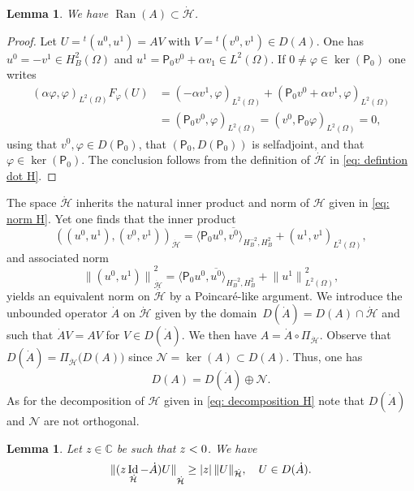 \documentclass[JEP,XML,SOM,Unicode,published]{cedram}
\theoremstyle{plain}
\newtheorem{lemma}[theorem]{Lemma}
\theoremstyle{definition}
\def\C{\mathbb{C}}
\let \Re \relax
\DeclareMathOperator{\Re}{Re}
\newcommand{\ovl}[1]{\overline{#1}}
\newcommand{\inp}[2]{(#1, #2)}
\newcommand{\dup}[2]{\langle #1 , #2 \rangle}
\renewcommand{\H}{{\mathcal H}}
\newcommand{\transp}{\ensuremath{\phantom{}^{t}}}
\newcommand{\Norm}[2]{{\| #1 \|}_{#2}}
\newcommand{\Pell}{\mathsf P_0}
\DeclareMathOperator{\id}{Id}
\DeclareMathOperator{\range}{Ran}
\begin{document}
\begin{lemma}
\label{lemma: stability dot H}
We have $\range(A) \subset \dot{\H}$.
\end{lemma}
\begin{proof}
Let $U = \transp(u^0,u^1)= A V$ with $V= \transp(v^0,v^1) \in
D(A)$. One has $u^0 = -v^1 \in H^2_B (\Omega) $ and $u^1 = \Pell
v^0 + \alpha v_1 \in
L^2(\Omega)$. If $0 \neq \varphi \in \ker(\Pell)$ one writes
\begin{align*}
\inp{\alpha\varphi}{\varphi}_{L^2(\Omega)}
F_{\varphi} (U) &=
\inp{-\alpha v^1}{\varphi}_{L^2(\Omega)}
+ \inp{\Pell v^0 + \alpha v^1}{\varphi}_{L^2(\Omega)}\\
&=\inp{\Pell v^0}{\varphi}_{L^2(\Omega)}
= \inp{v^0}{\Pell \varphi}_{L^2(\Omega)}=0,
\end{align*}
using that $v^0, \varphi \in D(\Pell)$, that $(\Pell, D(\Pell))$ is
selfadjoint, and that $\varphi \in \ker(\Pell)$. The conclusion
follows from the definition of $\dot{\H}$ in \eqref{eq: defintion dot H}.
\end{proof}
The space $\dot{\H}$ inherits the natural inner product and norm of
$\H$ given in \eqref{eq: norm H}.
Yet one finds that the inner product
\begin{equation}
\label{eq: inner product dot H}
\inp{(u^0,u^1)}{(v^0,v^1)}_{\dot \H}
= \dup{\Pell u^0}{\ovl{v^0}}_{H^{-2}_B,H^2_B}
+ \inp{u^1}{v^1}_{L^2(\Omega)},
\end{equation}
and associated norm
\begin{equation}
\label{eq: norm dot H}
\Norm{(u^0,u^1)}{\dot \H}^2
= \dup{\Pell u^0}{\ovl{u^0}}_{H^{-2}_B,H^2_B} + \Norm{u^1}{L^2(\Omega)}^2,
\end{equation}
yields an equivalent norm on $\dot \H$ by a Poincaré-like argument.
We introduce the unbounded operator
$\dot{A}$ on $\dot{\H}$ given by the domain~\hbox{$D(\dot{A}) = D(A) \cap \dot{\H}$}
and such that $\dot{A} V = A V$ for $V \in D(\dot{A})$. We then have
$ A= \dot{A}\circ \Pi_{\dot \H}$.
Observe that $D(\dot{A}) = \Pi_{\dot \H} \big(D(A)\big)$ since
$\mathcal N = \ker(A) \subset D(A)$. Thus,
one has
\begin{equation}
\label{eq: decomposition D(A)}
D(A) =D(\dot{A}) \oplus {\mathcal N}.
\end{equation}
As for the decomposition of $\H$ given in \eqref{eq: decomposition H}
note that $D(\dot{A})$ and ${\mathcal N}$ are not orthogonal.

\begin{lemma}
\label{lemma: a priori resolvent estimate}
Let $z \in \C$ be such that $\Re z<0$. We have
\begin{equation*}
\Norm{(z \id_{\dot{\H}} - \dot A) U}{\dot{\H}} \geq |\Re z| \,
\Norm{U}{\dot{\H}}, \quad U \in D(\dot A).
\end{equation*}
\end{lemma}
\end{document}
